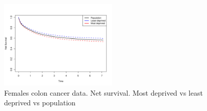 \documentclass[12pt]{article}
\begin{document}
\pagebreak

\begin{figure}[h!]
\centering
\includegraphics[width=0.5\textwidth]{nsdep15_females.pdf} 
\caption{ Females colon cancer data. Net survival. Most deprived vs least deprived vs population}
\label{fig:nsdep_females}
\end{figure}
\end{document}
